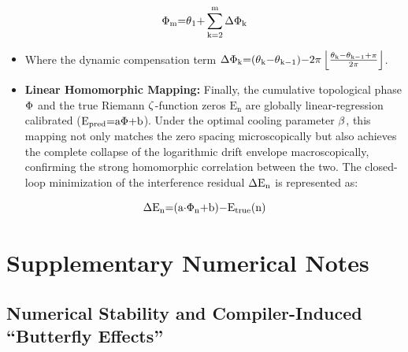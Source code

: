 \documentclass[fractalfract,article,submit,oneauthor,pdftex]{Definitions/mdpi}
\begin{document}
\begin{equation}
\text{\ensuremath{\Phi}}_{\text{m}}\text{=}\text{\ensuremath{\theta}}_{\text{1}}\text{+}\sum_{\text{k}\text{=2}}^{\text{m}}\text{\ensuremath{\Delta}}\text{\ensuremath{\Phi}}_{\text{k}}
\end{equation}

\begin{itemize}
\item
  Where the dynamic compensation term
  \(\text{\ensuremath{\Delta}}\text{\ensuremath{\Phi}}_{\text{k}}\text{=(}\text{\ensuremath{\theta}}_{\text{k}}\text{\ensuremath{-}}\text{\ensuremath{\theta}}_{\text{k}\text{\ensuremath{-}1}}\text{)\ensuremath{-}2}\text{\ensuremath{\pi}}\left\lfloor \frac{\text{\ensuremath{\theta}}_{\text{k}}\text{\ensuremath{-}}\text{\ensuremath{\theta}}_{\text{k}\text{\ensuremath{-}1}}\text{+}\text{\ensuremath{\pi}}}{\text{2}\text{\ensuremath{\pi}}} \right\rfloor\).
\end{itemize}

\begin{itemize}
\item
  \textbf{Linear Homomorphic Mapping:} Finally, the cumulative
  topological phase \(\text{\ensuremath{\Phi}}\) and the true Riemann
  \(\text{\ensuremath{\zeta}}\)-function zeros \(\text{E}_{\text{n}}\) are globally
  linear-regression calibrated
  (\(\text{E}_{\text{pred}}\text{=}\text{a}\text{\ensuremath{\Phi}+}\text{b}\)). Under
  the optimal cooling parameter \(\text{\ensuremath{\beta}}\), this mapping not only
  matches the zero spacing microscopically but also achieves the
  complete collapse of the logarithmic drift envelope macroscopically,
  confirming the strong homomorphic correlation between the two. The
  closed-loop minimization of the interference residual
  \(\text{\ensuremath{\Delta}}\text{E}_{\text{n}}\) is represented as:
\end{itemize}

\begin{equation}
\text{\ensuremath{\Delta}}\text{E}_{\text{n}}\text{=(}\text{a}\text{\ensuremath{\cdot}}\text{\ensuremath{\Phi}}_{\text{n}}\text{+}\text{b}\text{)\ensuremath{-}}\text{E}_{\text{true}}\text{(}\text{n}\text{)}
\end{equation}

\appendix
\section{Supplementary Numerical Notes}

\subsection{Numerical Stability and Compiler-Induced ``Butterfly Effects''}
\end{document}
